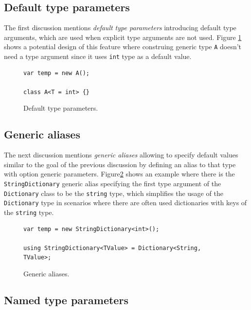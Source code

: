\subsection{Default type parameters} \label{sect07:is1}

The first discussion \cite{online:DefTypeParam} mentions \textit{default type parameters} introducing default type arguments, which are used when explicit type arguments are not used. 
Figure \ref{img19:defTypeParam} shows a potential design of this feature where construing generic type \texttt{A} doesn’t need a type argument since it uses \texttt{int} type as a default value. 
\begin{figure}[h]
\begin{lstlisting}[style=csharp]
var temp = new A();

class A<T = int> {}
\end{lstlisting}
\caption{Default type parameters.}
\label{img19:defTypeParam}
\end{figure}

\subsection{Generic aliases} \label{sect08:is2}

The next discussion \cite{online:GenAlias} mentions \textit{generic aliases} allowing to specify default values similar to the goal of the previous discussion by defining an alias to that type with option generic parameters. 
Figure\ref{img20:genAlias} shows an example where there is the \texttt{StringDictionary} generic alias specifying the first type argument of the \texttt{Dictionary} class to be the \texttt{string} type, which simplifies the usage of the \texttt{Dictionary} type in scenarios where there are often used dictionaries with keys of the \texttt{string} type.
\begin{figure}[h]
\begin{lstlisting}[style=csharp]
var temp = new StringDictionary<int>();

using StringDictionary<TValue> = Dictionary<String, TValue>;
\end{lstlisting}
\caption{Generic aliases.}
\label{img20:genAlias}
\end{figure}

\subsection{Named type parameters} \label{sect09:is3}


